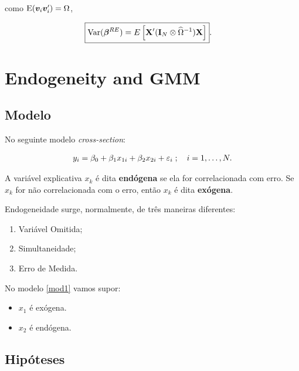 \documentclass[11pt, oneside, a4paper, article]{article}
\numberwithin{equation}{section}
\begin{document}
\begin{description}
\noindent
como $\text{E}( \boldsymbol{v}_{i} \boldsymbol{v}_{i}' ) =\Omega$,

\vspace{-1 em}
\begin{align*} 
	\Aboxed{
\Var( \betavec^{RE} ) = 
E
\left[ \Xmat' ( \Imat_{N} \otimes \widehat{\Omega}^{-1} ) \Xmat \right] }.
\end{align*}



\clearpage
\section{Endogeneity and GMM}


\subsection{Modelo}

No seguinte modelo \textit{cross-section}:

\vspace{-1 em}
\begin{align} \label{mod1}
	y_{i} = \beta_{0} + \beta_{1} x_{1i} + \beta_{2} x_{2i} + \varepsilon_{i}
	\; ; \quad i = 1, \dots, N.
\end{align}

\noindent
A variável explicativa $x_{k}$ é dita \textbf{endógena} se ela for correlacionada com erro.
Se $x_{k}$ for não correlacionada com o erro, então $x_{k}$ é dita \textbf{exógena}.

Endogeneidade surge, normalmente, de três maneiras diferentes:

\begin{enumerate}\itemsep0pt
	\item Variável Omitida;
	\item Simultaneidade;
	\item Erro de Medida.
\end{enumerate}

No modelo \eqref{mod1} vamos supor:

\begin{itemize}\itemsep0pt
	\item $x_{1}$ é exógena.
	\item $x_{2}$ é endógena.
\end{itemize}

\subsection{Hipóteses}


\end{description}
\end{document}

